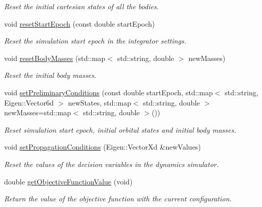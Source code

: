 \begin{DoxyCompactItemize}
\begin{DoxyCompactList}\small\item\em Reset the initial cartesian states of all the bodies. \end{DoxyCompactList}\item 
void \hyperlink{structtudat_1_1optimization_1_1MissionSegmentSettings_a583644cd0c920f276f119b1645ddeff0}{reset\+Start\+Epoch} (const double start\+Epoch)
\begin{DoxyCompactList}\small\item\em Reset the simulation start epoch in the integrator settings. \end{DoxyCompactList}\item 
void \hyperlink{structtudat_1_1optimization_1_1MissionSegmentSettings_a4fc917e2c0eb2279d687abab32ac545b}{reset\+Body\+Masses} (std\+::map$<$ std\+::string, double $>$ new\+Masses)
\begin{DoxyCompactList}\small\item\em Reset the initial body masses. \end{DoxyCompactList}\item 
void \hyperlink{structtudat_1_1optimization_1_1MissionSegmentSettings_ae9f9953868505feb740cfb1795bf1861}{set\+Preliminary\+Conditions} (const double start\+Epoch, std\+::map$<$ std\+::string, Eigen\+::\+Vector6d $>$ new\+States, std\+::map$<$ std\+::string, double $>$ new\+Masses=std\+::map$<$ std\+::string, double $>$())
\begin{DoxyCompactList}\small\item\em Reset simulation start epoch, initial orbital states and initial body masses. \end{DoxyCompactList}\item 
void \hyperlink{structtudat_1_1optimization_1_1MissionSegmentSettings_ac4ec457f12b9b691c3afb92bad8fef38}{set\+Propagation\+Conditions} (Eigen\+::\+Vector\+Xd \&new\+Values)
\begin{DoxyCompactList}\small\item\em Reset the values of the decision variables in the dynamics simulator. \end{DoxyCompactList}\item 
double \hyperlink{structtudat_1_1optimization_1_1MissionSegmentSettings_a778ecad548173f907b9268ebb452bd68}{get\+Objective\+Function\+Value} (void)
\begin{DoxyCompactList}\small\item\em Return the value of the objective function with the current configuration. \end{DoxyCompactList}\end{DoxyCompactItemize}
